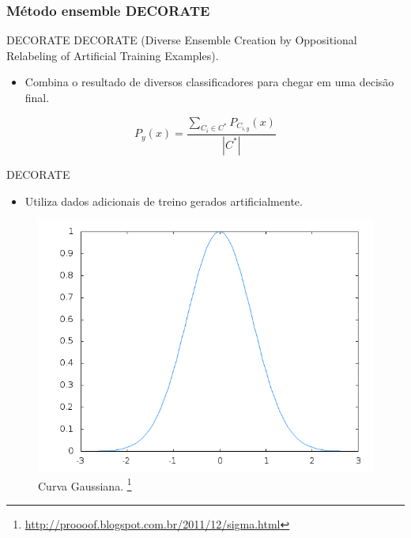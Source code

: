 \documentclass[brazil]{beamer}
\DeclareMathOperator*{\argmax}{arg\,max}
\begin{document}
\subsubsection{Método ensemble DECORATE }

\begin{frame}{DECORATE \cite{Melville:2003, Melville:2004}}
\justifying DECORATE (Diverse Ensemble Creation by Oppositional Relabeling of Artificial Training Examples).
   \begin{itemize}
\justifying
      \item Combina o resultado de diversos classificadores para chegar em uma decisão final.
   \end{itemize}

\begin{equation}
  P_{y}(x) = \frac{\sum\limits_{C_{i}\in C^*} P_{C_{i,y}}(x)}{|C^*|}
  \label{eq:decorate}
\end{equation}


\end{frame}

\begin{frame}{DECORATE}
   \begin{itemize}
\justifying
      \item Utiliza dados adicionais de treino gerados artificialmente.
   \end{itemize}
   \begin{figure}[!htb] \centering 
     \centering
     \includegraphics[width=.65\columnwidth]{slide/gaussiana1} 
     \caption{Curva Gaussiana. \footnote[frame]{\url{http://proooof.blogspot.com.br/2011/12/sigma.html}}} 
     \label{fig:gaussiana1}
   \end{figure}
\end{frame}
\end{document}
